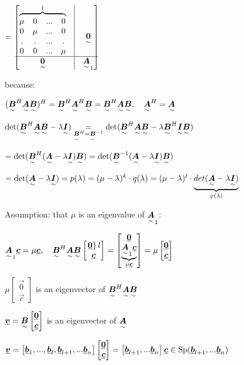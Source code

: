 $=\begin{bmatrix}
\overbrace{\begin{matrix}\mu&0&...&0\\0&\mu&...&0\\.&.&...&.\\0&0&...&\mu\end{matrix}}^{l} &\vline& \ma{0}\\ \hline \ma{0}&\vline& \ma{A}_1
\end{bmatrix} $

because: 

$(\ma{B}^H\ma{A}\ma{B})^H=\ma{B}^H\ma{A}^H\ma{B}=\ma{B}^H\ma{A}\ma{B},\quad
\ma{A}^H=\ma{A}$

$\det(\ma{B}^H\ma{A}\ma{B}-\lambda\ma{I})\underset{\ma{B}^H=\ma{B}^{-1}}{=} \det(\ma{B}^H\ma{A}\ma{B}-\lambda\ma{B}^H\ma{I}\ma{B})$

$=\det(\ma{B}^H(\ma{A}-\lambda\ma{I})\ma{B})=\det(\ma{B}^{-1}(\ma{A}-\lambda\ma{I})\ma{B})$

$=\det(\ma{A}-\lambda\ma{I})=p(\lambda)=(\mu-\lambda)^k\cdot q(\lambda)=(\mu-\lambda)^l\cdot \underbrace{ det(\ma{A} - \lambda \ma{I})}_{\varphi(\lambda)}$

Assumption: that $\mu$ is an eigenvalue of $\ma{A}_1$: 

$\ma{A}_1\vec{c}=\mu\vec{c}, \quad 
\ma{B}^H\ma{A}\ma{B}\begin{bmatrix}\left. \vec{0} \right\rbrace l \\ \vec{c}\end{bmatrix} =
\begin{bmatrix} \vec{0} \\ \underbrace{\ma{A}_1\vec{c}}_{\mu\vec{c}}\end{bmatrix}
=\mu\begin{bmatrix} \vec{0} \\ \vec{c}\end{bmatrix}$

$\mu\begin{bmatrix} \vec{0} \\ \vec{c}\end{bmatrix}$ is an eigenvector of $\ma{B}^H\ma{A}\ma{B}$

$\vec{v}=\ma{B}\begin{bmatrix} \vec{0} \\ \vec{c}\end{bmatrix}$ is an eigenvector of $\ma{A}$

$\vec{v}=\begin{bmatrix} \vec{b}_1,...,\vec{b}_l,\vec{b}_{l+1},...\vec{b}_n\end{bmatrix}\begin{bmatrix} \vec{0} \\ \vec{c}\end{bmatrix}=\begin{bmatrix} \vec{b}_{l+1},...\vec{b}_n\end{bmatrix}\vec{c}\in \Sp(\vec{b}_{l+1},...\vec{b}_n)$

